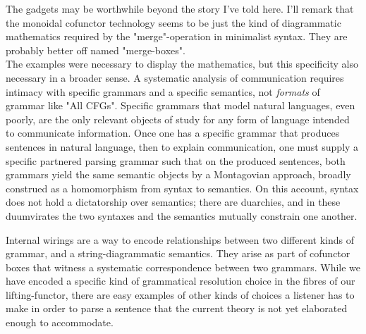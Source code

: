 The gadgets may be worthwhile beyond the story I've told here. I'll remark that the monoidal cofunctor technology seems to be just the kind of diagrammatic mathematics required by the "merge"-operation in minimalist syntax. They are probably better off named "merge-boxes".\\

The examples were necessary to display the mathematics, but this specificity also necessary in a broader sense. A systematic analysis of communication requires intimacy with specific grammars and a specific semantics, not \emph{formats} of grammar like "All CFGs". Specific grammars that model natural languages, even poorly, are the only relevant objects of study for any form of language intended to communicate information. Once one has a specific grammar that produces sentences in natural language, then to explain communication, one must supply a specific partnered parsing grammar such that on the produced sentences, both grammars yield the same semantic objects by a Montagovian approach, broadly construed as a homomorphism from syntax to semantics. On this account, syntax does not hold a dictatorship over semantics; there are duarchies, and in these duumvirates the two syntaxes and the semantics mutually constrain one another.


Internal wirings are a way to encode relationships between two different kinds of grammar, and a string-diagrammatic semantics. They arise as part of cofunctor boxes that witness a systematic correspondence between two grammars. While we have encoded a specific kind of grammatical resolution choice in the fibres of our lifting-functor, there are easy examples of other kinds of choices a listener has to make in order to parse a sentence that the current theory is not yet elaborated enough to accommodate.

